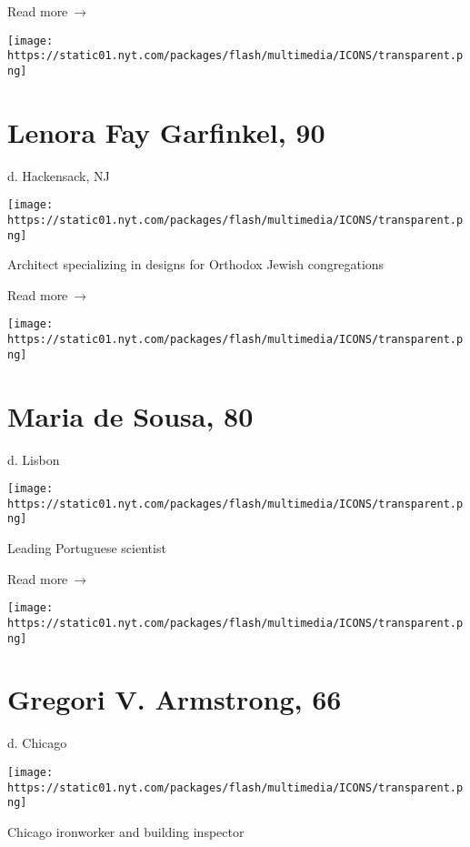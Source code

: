  Read more~→

\href{https://www.nytimes.com/2020/07/03/obituaries/lenora-garfinkel-dead-coronavirus.html}{}

\texttt{[image: https://static01.nyt.com/packages/flash/multimedia/ICONS/transparent.png]}

\hypertarget{lenora-fay-garfinkel-90}{%
\section{Lenora Fay Garfinkel, 90}\label{lenora-fay-garfinkel-90}}

d. Hackensack, NJ

\texttt{[image: https://static01.nyt.com/packages/flash/multimedia/ICONS/transparent.png]}

Architect specializing in designs for Orthodox Jewish congregations

 Read more~→

\href{https://www.nytimes.com/2020/07/02/obituaries/maria-de-sousa-dead-coronavirus.html}{}

\texttt{[image: https://static01.nyt.com/packages/flash/multimedia/ICONS/transparent.png]}

\hypertarget{maria-de-sousa-80}{%
\section{Maria de Sousa, 80}\label{maria-de-sousa-80}}

d. Lisbon

\texttt{[image: https://static01.nyt.com/packages/flash/multimedia/ICONS/transparent.png]}

Leading Portuguese scientist

 Read more~→

\href{https://www.nytimes.com/2020/07/02/us/gregori-armstrong-dead-coronavirus.html}{}

\texttt{[image: https://static01.nyt.com/packages/flash/multimedia/ICONS/transparent.png]}

\hypertarget{gregori-v-armstrong-66}{%
\section{Gregori V. Armstrong, 66}\label{gregori-v-armstrong-66}}

d. Chicago

\texttt{[image: https://static01.nyt.com/packages/flash/multimedia/ICONS/transparent.png]}

Chicago ironworker and building inspector

